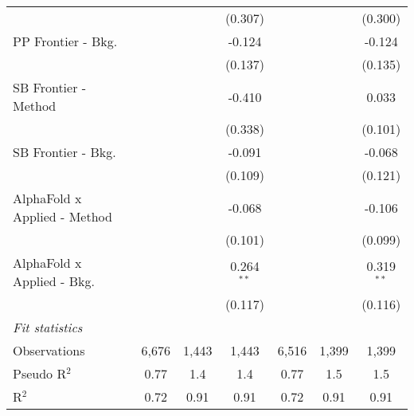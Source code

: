 \begin{tabular}{lcccccc}
                                &                &         & (0.307)       &                &         & (0.300)\\   
   PP Frontier - Bkg.           &                &         & -0.124        &                &         & -0.124\\   
                                &                &         & (0.137)       &                &         & (0.135)\\   
   SB Frontier - Method         &                &         & -0.410        &                &         & 0.033\\   
                                &                &         & (0.338)       &                &         & (0.101)\\   
   SB Frontier - Bkg.           &                &         & -0.091        &                &         & -0.068\\   
                                &                &         & (0.109)       &                &         & (0.121)\\   
   AlphaFold x Applied - Method &                &         & -0.068        &                &         & -0.106\\   
                                &                &         & (0.101)       &                &         & (0.099)\\   
   AlphaFold x Applied - Bkg.   &                &         & 0.264$^{**}$  &                &         & 0.319$^{**}$\\   
                                &                &         & (0.117)       &                &         & (0.116)\\   
   \midrule
   \emph{Fit statistics}\\
   Observations                 & 6,676          & 1,443   & 1,443         & 6,516          & 1,399   & 1,399\\  
   Pseudo R$^2$                 & 0.77           & 1.4     & 1.4           & 0.77           & 1.5     & 1.5\\  
   R$^2$                        & 0.72           & 0.91    & 0.91          & 0.72           & 0.91    & 0.91\\  
   

\end{tabular}
